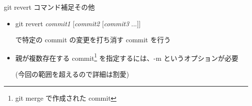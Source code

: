 \begin{frame}[t]{git revert コマンド補足}{その他}

  \begin{itemize}
  \item git revert \textit{commit1} [\textit{commit2} [\textit{commit3} ...]]

    で特定の commit の変更を打ち消す commit を行う
    \vspace{2ex}

  \item 親が複数存在する commit\footnote{git merge で作成された commit} を指定するには、-m というオプションが必要

    (今回の範囲を超えるので詳細は割愛)
  \end{itemize}

\end{frame}
